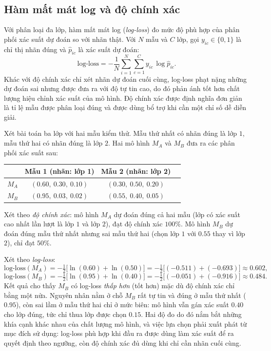\subsection{Hàm mất mát log và độ chính xác}
Với phân loại đa lớp, hàm mất mát log (\textit{log-loss}) đo mức độ phù hợp của
phân phối xác suất dự đoán so với nhãn thật. Với $N$ mẫu và $C$ lớp, gọi
$y_{ic} \in \{0,1\}$ là chỉ thị nhãn đúng và $\hat{p}_{ic}$ là xác suất dự đoán:
\[
    \text{log-loss} = -\frac{1}{N}\sum_{i=1}^{N}\sum_{c=1}^{C}
    y_{ic}\,\log \hat{p}_{ic}.
\]
Khác với độ chính xác chỉ xét nhãn dự đoán cuối cùng, log-loss phạt nặng những dự
đoán sai nhưng được đưa ra với độ tự tin cao, do đó phản ánh tốt hơn chất lượng
hiệu chỉnh xác suất của mô hình. Độ chính xác được định nghĩa đơn giản là tỉ lệ
mẫu được phân loại đúng và được dùng bổ trợ khi cần một chỉ số dễ diễn giải.

\begin{vidu}
\label{vd:logloss}
Xét bài toán ba lớp với hai mẫu kiểm thử. Mẫu thứ nhất có nhãn đúng là lớp $1$,
mẫu thứ hai có nhãn đúng là lớp $2$. Hai mô hình $M_A$ và $M_B$ đưa ra các phân
phối xác suất sau:
\begin{center}
\begin{tabular}{@{}lccc@{}}
\toprule
 & Mẫu 1 (nhãn: lớp 1) & Mẫu 2 (nhãn: lớp 2) \\
\midrule
$M_A$ & $(0.60,\ 0.30,\ 0.10)$ & $(0.30,\ 0.50,\ 0.20)$ \\
$M_B$ & $(0.95,\ 0.03,\ 0.02)$ & $(0.55,\ 0.40,\ 0.05)$ \\
\bottomrule
\end{tabular}
\end{center}

Xét theo \emph{độ chính xác}: mô hình $M_A$ dự đoán đúng cả hai mẫu (lớp có xác
suất cao nhất lần lượt là lớp $1$ và lớp $2$), đạt độ chính xác $100\%$. Mô hình
$M_B$ dự đoán đúng mẫu thứ nhất nhưng sai mẫu thứ hai (chọn lớp $1$ với $0.55$
thay vì lớp $2$), chỉ đạt $50\%$.

Xét theo \emph{log-loss}:
\[
    \text{log-loss}(M_A) = -\tfrac{1}{2}\big[\ln(0.60) + \ln(0.50)\big]
    = -\tfrac{1}{2}\big[(-0.511) + (-0.693)\big] \approx 0.602,
\]
\[
    \text{log-loss}(M_B) = -\tfrac{1}{2}\big[\ln(0.95) + \ln(0.40)\big]
    = -\tfrac{1}{2}\big[(-0.051) + (-0.916)\big] \approx 0.484.
\]
Kết quả cho thấy $M_B$ có log-loss \emph{thấp hơn} (tốt hơn) mặc dù độ chính xác
chỉ bằng một nửa. Nguyên nhân nằm ở chỗ $M_B$ rất tự tin và đúng ở mẫu thứ nhất
($0.95$), còn sai lầm ở mẫu thứ hai chỉ ở mức biên: mô hình vẫn gán xác suất
$0.40$ cho lớp đúng, tức chỉ thua lớp được chọn $0.15$. Hai độ đo do đó nắm bắt
những khía cạnh khác nhau của chất lượng mô hình, và việc lựa chọn phải xuất phát
từ mục đích sử dụng: log-loss phù hợp khi đầu ra được dùng làm xác suất để ra
quyết định theo ngưỡng, còn độ chính xác đủ dùng khi chỉ cần nhãn cuối cùng.
\end{vidu}

